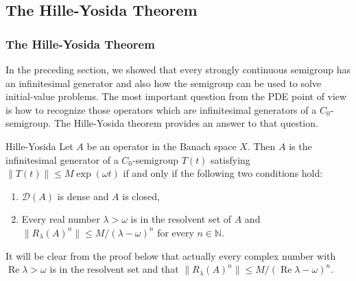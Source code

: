 \subsection{The Hille-Yosida Theorem}\label{sec:hille-yosida-theorem}

\subsubsection{The Hille-Yosida Theorem}\label{subsec:hille-yosida-theorem}

In the preceding section, we showed that every strongly continuous semigroup has an infinitesimal generator and also how the semigroup can be used to solve initial-value problems. The most important question from the PDE point of view is how to recognize those operators which are infinitesimal generators of a $C_0$-semigroup. The Hille-Yosida theorem provides an answer to that question.

\begin{Theorem}{Hille-Yosida}
\label{thm:hille-yosida-generation}
Let $A$ be an operator in the Banach space $X$. Then $A$ is the infinitesimal generator of a $C_0$-semigroup $T(t)$ satisfying $\|T(t)\|\leq M\exp(\omega t)$ if and only if the following two conditions hold:\begin{enumerate}\item\label{hyp:hille-yosida-dense-closed} $\mathcal{D}(A)$ is dense and $A$ is closed,\item\label{hyp:hille-yosida-resolvent-powers} Every real number $\lambda>\omega$ is in the resolvent set of $A$ and $\|R_\lambda(A)^n\|\leq M/(\lambda-\omega)^n$ for every $n\in\mathbb{N}$.\end{enumerate}
\end{Theorem}

It will be clear from the proof below that actually every complex number with $\operatorname{Re}\lambda>\omega$ is in the resolvent set and that $\|R_\lambda(A)^n\|\leq M/(\operatorname{Re}\lambda-\omega)^n$.

